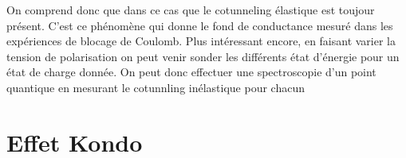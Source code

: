 On comprend donc que dans ce cas que le cotunneling élastique est toujour présent. C'est ce phénomène qui donne le fond de conductance mesuré dans les expériences de blocage de Coulomb. Plus intéressant encore, en faisant varier la tension de polarisation on peut venir sonder les différents état d'énergie pour un état de charge donnée. On peut donc effectuer une spectroscopie d'un point quantique en mesurant le cotunnling inélastique pour chacun

\section{Effet Kondo}